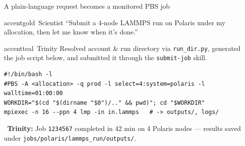 \documentclass[aspectratio=169,11pt]{beamer}
\begin{document}
\begin{frame}[fragile]{A plain-language request becomes a monitored PBS job}
  \begin{chatbubble}{accentgold}{\faUser\ Scientist}
    \scriptsize ``Submit a 4-node LAMMPS run on Polaris under my allocation, then let me know when it's done.''
  \end{chatbubble}
  \vspace{1pt}
  \begin{chatbubble}{accentteal}{\faRobot\ Trinity}
    \scriptsize Resolved account \& run directory via \texttt{run\_dir.py}, generated the job script below,
    and submitted it through the \texttt{submit-job} skill.
  \end{chatbubble}
  \vspace{1pt}
  \noindent{}\par\vspace{0pt}
  \begin{lstlisting}[style=shell]
#!/bin/bash -l
#PBS -A <allocation> -q prod -l select=4:system=polaris -l walltime=01:00:00
WORKDIR="$(cd "$(dirname "$0")/.." && pwd)"; cd "$WORKDIR"
mpiexec -n 16 --ppn 4 lmp -in in.lammps   # -> outputs/, logs/
  \end{lstlisting}
  \vspace{1pt}
  \begin{tcolorbox}[enhanced, colback=accentteal!10, colframe=accentteal!60!black, boxrule=0.5pt,
    arc=4pt, left=6pt, right=6pt, top=2pt, bottom=2pt, width=\linewidth,
    drop fuzzy shadow]
    \scriptsize\faCheckCircle\ \textbf{Trinity:} Job \texttt{1234567} completed in 42 min on 4 Polaris nodes ---
    results saved under \texttt{jobs/polaris/lammps\_run/outputs/}.
  \end{tcolorbox}
\end{frame}
\end{document}
